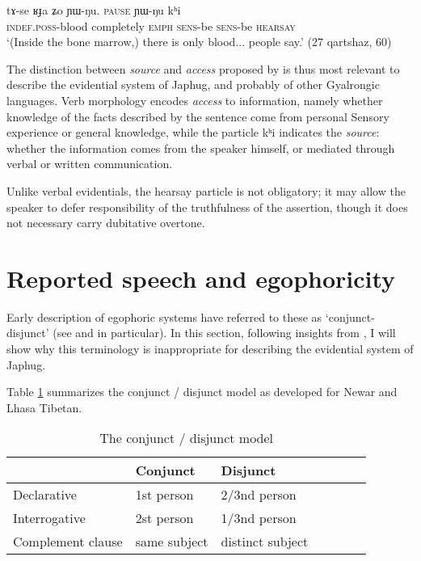 \documentclass[oldfontcommands,oneside,a4paper,11pt]{article}
\newcommand{\ipa}[1]{{\phon \mbox{#1}}} %
\begin{document}
\begin{exe}
\ex \label{ex:hesitation.khi}
\gll
\ipa{tɤ-se} 	\ipa{ʁɟa} 	\ipa{ʑo} 	\ipa{ɲɯ-ŋu.} \textsc{pause}  \ipa{ɲɯ-ŋu} \ipa{kʰi}  \\
\textsc{indef.poss}-blood completely \textsc{emph} \textsc{sens}-be { }  \textsc{sens}-be \textsc{hearsay} \\
\glt `(Inside the bone marrow,) there is only blood... people say.' (27 qartshaz, 60)
\end{exe} 

The distinction between \textit{source} and \textit{access}  proposed by \citet{tournadre14evidentiality} is thus most relevant to describe the evidential system of Japhug, and probably of other Gyalrongic languages. Verb morphology encodes \textit{access} to information, namely whether knowledge of the facts described by the sentence come from personal Sensory experience or general knowledge, while the particle \ipa{kʰi} indicates the \textit{source}: whether the information comes from the speaker himself, or mediated through verbal or written communication.

Unlike verbal evidentials, the hearsay particle is not obligatory; it may allow the speaker to defer responsibility of the truthfulness of the assertion,  though it does not necessary carry dubitative overtone.

\section{Reported speech and egophoricity}  
Early description of egophoric systems have referred to these as `conjunct-disjunct'  (see \citet{hale80conjunct} and \citet{delancey90erg} in particular). In this section, following insights from   \citet{tournadre08conjunct}, I will show why this terminology is inappropriate for describing the evidential system of Japhug.

 Table \ref{tab:conjunct} summarizes the conjunct / disjunct model as developed for Newar and Lhasa Tibetan. 

\begin{table}[H]
\caption{The conjunct / disjunct model} \label{tab:conjunct} \centering
\begin{tabular}{lllllll}
\toprule
& Conjunct & Disjunct \\
\midrule
Declarative & 1st person & 2/3nd person \\
Interrogative & 2st person & 1/3nd person \\
Complement clause & same subject & distinct subject \\
\bottomrule
\end{tabular}
\end{table}
  
\end{document}
